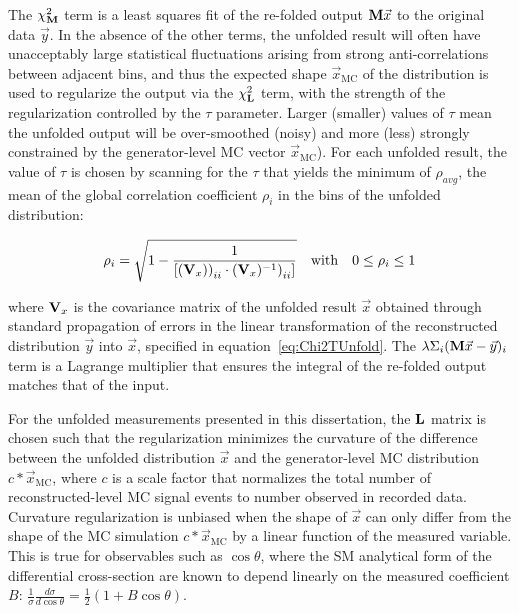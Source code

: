 The $\chi^{2}_{\mathbf{M}}$ term is a least squares fit of the re-folded output $\mathbf{M}\vec{x}$ to the original data $\vec{y}$.
In the absence of the other terms, the unfolded result will often have unacceptably large statistical fluctuations arising from strong anti-correlations between adjacent bins, and thus the expected shape $\vec{x}_{\text{MC}}$ of the distribution is used to regularize the output via the $\chi^{2}_{\mathbf{L}}$ term, with the strength of the regularization controlled by the $\tau$ parameter. 
Larger (smaller) values of $\tau$ mean the unfolded output will be over-smoothed (noisy) and more (less) strongly constrained by the generator-level MC vector $\vec{x}_{\text{MC}}$).
For each unfolded result, the value of $\tau$ is chosen by scanning for the $\tau$ that yields the minimum of $\rho_{avg}$, the mean of the global correlation coefficient $\rho_{i}$ in the bins of the unfolded distribution:
\begin{linenomath*}
\begin{align}
\rho_{i} = \sqrt{1 - \frac{1}{[{(\mathbf{V}_{x}))}_{ii} \cdot {(\mathbf{V}_{x})^{-1})}_{ii}]}} \quad \text{with} \quad 0 \leq \rho_{i} \leq 1
\end{align}
\end{linenomath*}
where $\mathbf{V}_{x}$ is the covariance matrix of the unfolded result $\vec{x}$ obtained through standard propagation of errors in the linear transformation of the reconstructed distribution $\vec{y}$ into $\vec{x}$, specified in equation~\ref{eq:Chi2TUnfold}.
The $\lambda\Sigma_{i}(\mathbf{M}\vec{x}-\vec{y})_{i}$ term is a Lagrange multiplier that ensures the integral of the re-folded output matches that of the input.

For the unfolded measurements presented in this dissertation, the $\mathbf{L}$ matrix is chosen such that the regularization minimizes the curvature of the difference between the unfolded distribution $\vec{x}$ and the generator-level MC distribution $c*\vec{x}_{\text{MC}}$, where $c$ is a scale factor that normalizes the total number of reconstructed-level MC signal events to number observed in recorded data.
Curvature regularization is unbiased when the shape of $\vec{x}$ can only differ from the shape of the MC simulation $c*\vec{x}_{\text{MC}}$ by a linear function of the measured variable. 
This is true for observables such as $\cos\theta$, where the SM analytical form of the differential cross-section are known to depend linearly on the measured coefficient $B$: $\tfrac{1}{\sigma}\tfrac{d\sigma}{d\cos\theta} = \tfrac{1}{2} (1+B \cos\theta)$. 

